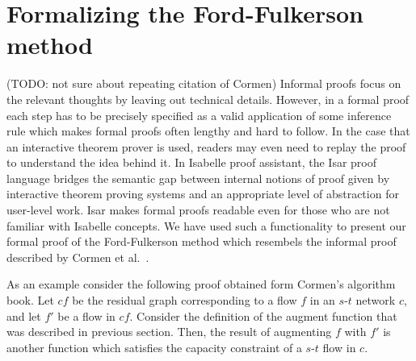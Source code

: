 \documentclass{llncs}
\begin{document}
\section{Formalizing the Ford-Fulkerson method}
%
%    
%      
%    
%    


(TODO: not sure about repeating citation of Cormen) Informal proofs focus on the relevant thoughts by leaving out technical details. However, in a formal proof each step has to be precisely specified as a valid application of some inference rule which makes formal proofs often lengthy and hard to follow. In the case that an interactive theorem prover is used, readers may even need to replay the proof to understand the idea behind it. In Isabelle proof assistant, the Isar proof language bridges the semantic gap between internal notions of proof given by interactive theorem proving systems and an appropriate level of abstraction for user-level work. Isar makes formal proofs readable even for those who are not familiar with Isabelle concepts. We have used such a functionality to present our formal proof of the Ford-Fulkerson method which resembels the informal proof described by Cormen et al.~\cite{CLRS09}.

As an example consider the following proof obtained form Cormen's algorithm book. Let $cf$ be the residual graph corresponding to a flow $f$ in an $s$-$t$ network $c$, and let $f'$ be a flow in $cf$. Consider the definition of the augment function that was described in previous section. Then, the result of augmenting $f$ with $f'$ is another function which satisfies the capacity constraint of a $s$-$t$ flow in $c$.
\end{document}
